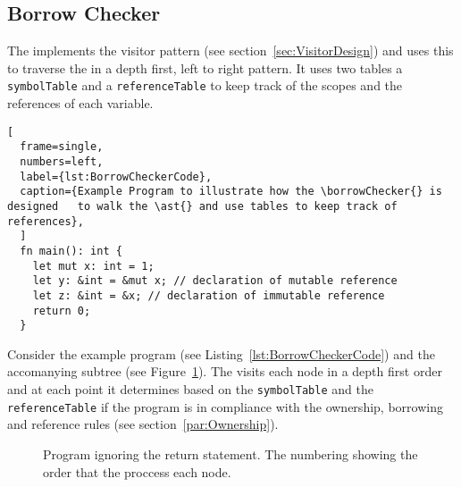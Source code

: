 \subsection{Borrow Checker}
\label{sec:BorrowCheckerDesign}

The \borrowChecker{} implements the visitor pattern (see
section~\ref{sec:VisitorDesign}) and uses this to traverse the \ast{} in a depth
first, left to right pattern. It uses two tables a \texttt{symbolTable} and a
\texttt{referenceTable} to keep track of the scopes and the
references of each variable.

\begin{lstlisting}[
  frame=single,
  numbers=left,
  label={lst:BorrowCheckerCode},
  caption={Example Program to illustrate how the \borrowChecker{} is designed   to walk the \ast{} and use tables to keep track of references},
  ]
  fn main(): int {
    let mut x: int = 1;
    let y: &int = &mut x; // declaration of mutable reference
    let z: &int = &x; // declaration of immutable reference
    return 0;
  }
\end{lstlisting}

Consider the example program (see Listing~\ref{lst:BorrowCheckerCode}) and the
accomanying subtree (see Figure~\ref{fig:astBorrowCheckerDesignCode}). The
\borrowChecker{} visits each node
in a depth first order and at each point it determines based on the \texttt{symbolTable}
and the \texttt{referenceTable} if the
program is in compliance with the ownership, borrowing and reference rules (see
section~\ref{par:Ownership}).

\begin{figure}[ht]
  \centering
  \caption{Program \ast{} ignoring the return statement. The numbering showing the
  order that the \borrowChecker{} proccess each node.}
  \label{fig:astBorrowCheckerDesignCode}
\end{figure}

